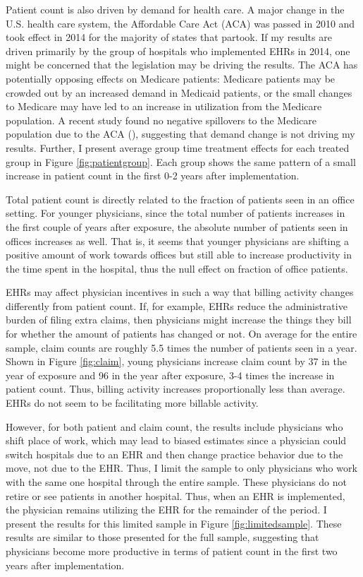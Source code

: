 \documentclass[11pt]{article}
\begin{document}
Patient count is also driven by demand for health care. A major change in the U.S. health care system, the Affordable Care Act (ACA) was passed in 2010 and took effect in 2014 for the majority of states that partook. If my results are driven primarily by the group of hospitals who implemented EHRs in 2014, one might be concerned that the legislation may be driving the results. The ACA has potentially opposing effects on Medicare patients: Medicare patients may be crowded out by an increased demand in Medicaid patients, or the small changes to Medicare may have led to an increase in utilization from the Medicare population. A recent study found no negative spillovers to the Medicare population due to the ACA (\cite{carey2020impact}), suggesting that demand change is not driving my results. Further, I present average group time treatment effects for each treated group in Figure \ref{fig:patientgroup}. Each group shows the same pattern of a small increase in patient count in the first 0-2 years after implementation. 

Total patient count is directly related to the fraction of patients seen in an office setting. For younger physicians, since the total number of patients increases in the first couple of years after exposure, the absolute number of patients seen in offices increases as well. That is, it seems that younger physicians are shifting a positive amount of work towards offices but still able to increase productivity in the time spent in the hospital, thus the null effect on fraction of office patients. 

EHRs may affect physician incentives in such a way that billing activity changes differently from patient count. If, for example, EHRs reduce the administrative burden of filing extra claims, then physicians might increase the things they bill for whether the amount of patients has changed or not. On average for the entire sample, claim counts are roughly 5.5 times the number of patients seen in a year. Shown in Figure \ref{fig:claim}, young physicians increase claim count by 37 in the year of exposure and 96 in the year after exposure, 3-4 times the increase in patient count. Thus, billing activity increases proportionally less than average. EHRs do not seem to be facilitating more billable activity. 

However, for both patient and claim count, the results include physicians who shift place of work, which may lead to biased estimates since a physician could switch hospitals due to an EHR and then change practice behavior due to the move, not due to the EHR. Thus, I limit the sample to only physicians who work with the same one hospital through the entire sample. These physicians do not retire or see patients in another hospital. Thus, when an EHR is implemented, the physician remains utilizing the EHR for the remainder of the period. I present the results for this limited sample in Figure \ref{fig:limitedsample}. These results are similar to those presented for the full sample, suggesting that physicians become more productive in terms of patient count in the first two years after implementation.
\end{document}

